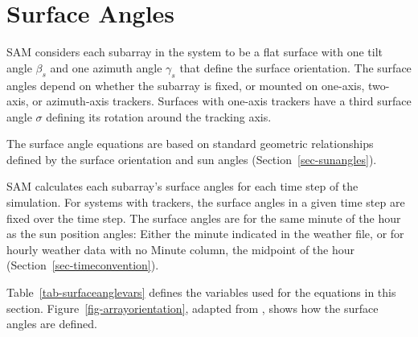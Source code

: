 \documentclass[12pt,letterpaper]{article}
\begin{document}
\chapter{Surface Angles}\label{sec-surfaceangles}

SAM considers each subarray in the system to be a flat surface with one tilt angle $\beta_s$ and one azimuth angle $\gamma_s$ that define the surface orientation. The surface angles depend on whether the subarray is fixed, or mounted on one-axis, two-axis, or azimuth-axis trackers. Surfaces with one-axis trackers have a third surface angle $\sigma$ defining its rotation around the tracking axis.

The surface angle equations are based on standard geometric relationships defined by the surface orientation and sun angles (Section~\ref{sec-sunangles}).

SAM calculates each subarray's surface angles for each time step of the simulation. For systems with trackers, the surface angles in a given time step are fixed over the time step. The surface angles are for the same minute of the hour as the sun position angles: Either the minute indicated in the weather file, or for hourly weather data with no Minute column, the midpoint of the hour (Section~\ref{sec-timeconvention}).

Table~\ref{tab-surfaceanglevars} defines the variables used for the equations in this section. Figure~\ref{fig-arrayorientation}, adapted from \citet{dunlap2007}, shows how the surface angles are defined.

\end{document}
